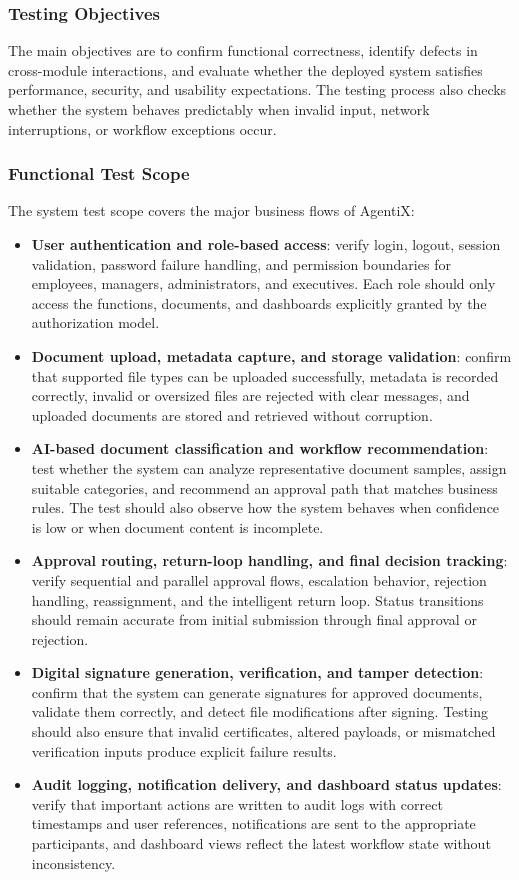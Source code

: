 \documentclass[12pt,oneside,openright,a4paper]{cpe-english-project}
\begin{document}
\subsubsection{Testing Objectives}

The main objectives are to confirm functional correctness, identify defects in cross-module interactions, and evaluate whether the deployed system satisfies performance, security, and usability expectations. The testing process also checks whether the system behaves predictably when invalid input, network interruptions, or workflow exceptions occur.

\subsubsection{Functional Test Scope}

The system test scope covers the major business flows of AgentiX:

\begin{itemize}
  \item \textbf{User authentication and role-based access}: verify login, logout, session validation, password failure handling, and permission boundaries for employees, managers, administrators, and executives. Each role should only access the functions, documents, and dashboards explicitly granted by the authorization model.
  \item \textbf{Document upload, metadata capture, and storage validation}: confirm that supported file types can be uploaded successfully, metadata is recorded correctly, invalid or oversized files are rejected with clear messages, and uploaded documents are stored and retrieved without corruption.
  \item \textbf{AI-based document classification and workflow recommendation}: test whether the system can analyze representative document samples, assign suitable categories, and recommend an approval path that matches business rules. The test should also observe how the system behaves when confidence is low or when document content is incomplete.
  \item \textbf{Approval routing, return-loop handling, and final decision tracking}: verify sequential and parallel approval flows, escalation behavior, rejection handling, reassignment, and the intelligent return loop. Status transitions should remain accurate from initial submission through final approval or rejection.
  \item \textbf{Digital signature generation, verification, and tamper detection}: confirm that the system can generate signatures for approved documents, validate them correctly, and detect file modifications after signing. Testing should also ensure that invalid certificates, altered payloads, or mismatched verification inputs produce explicit failure results.
  \item \textbf{Audit logging, notification delivery, and dashboard status updates}: verify that important actions are written to audit logs with correct timestamps and user references, notifications are sent to the appropriate participants, and dashboard views reflect the latest workflow state without inconsistency.
\end{itemize}
\end{document}
